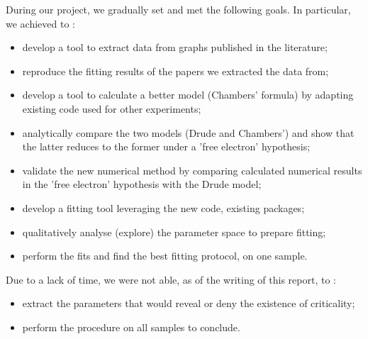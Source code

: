 During our project, we gradually set and met the following goals. In particular, we achieved to : 
\begin{itemize}
	\item develop a tool to extract data from graphs published in the literature;
	\item reproduce the fitting results of the papers we extracted the data from;
	\item develop a tool to calculate a better model (Chambers' formula) by adapting existing code used for other experiments;
	\item analytically compare the two models (Drude and Chambers') and show that the latter reduces to the former under a 'free electron' hypothesis;
	\item validate the new numerical method by comparing calculated numerical results in the 'free electron' hypothesis with the Drude model;
	\item develop a fitting tool leveraging the new code, existing packages;
	\item qualitatively analyse (explore) the parameter space to prepare fitting;
	\item perform the fits and find the best fitting protocol, on one sample.
\end{itemize}

\vspace{20mm}

Due to a lack of time, we were not able, as of the writing of this report, to :
\begin{itemize}
	\item extract the parameters that would reveal or deny the existence of criticality;
	\item perform the procedure on all samples to conclude.
\end{itemize}
